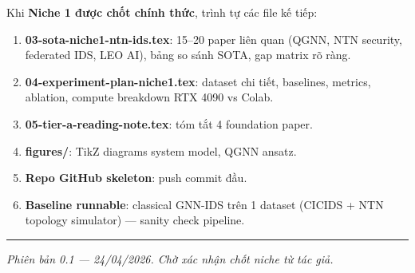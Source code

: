 \documentclass[11pt,a4paper]{article}
\begin{document}
Khi \textbf{Niche 1 được chốt chính thức}, trình tự các file kế tiếp:

\begin{enumerate}
  \item \textbf{03-sota-niche1-ntn-ids.tex}: 15--20 paper liên quan (QGNN, NTN security, federated IDS, LEO AI), bảng so sánh SOTA, gap matrix rõ ràng.
  \item \textbf{04-experiment-plan-niche1.tex}: dataset chi tiết, baselines, metrics, ablation, compute breakdown RTX 4090 vs Colab.
  \item \textbf{05-tier-a-reading-note.tex}: tóm tắt 4 foundation paper.
  \item \textbf{figures/}: TikZ diagrams system model, QGNN ansatz.
  \item \textbf{Repo GitHub skeleton}: push commit đầu.
  \item \textbf{Baseline runnable}: classical GNN-IDS trên 1 dataset (CICIDS + NTN topology simulator) --- sanity check pipeline.
\end{enumerate}

\vspace{0.4cm}
\hrule
\vspace{0.3cm}
\textit{\small Phiên bản 0.1 --- 24/04/2026. Chờ xác nhận chốt niche từ tác giả.}
\end{document}
